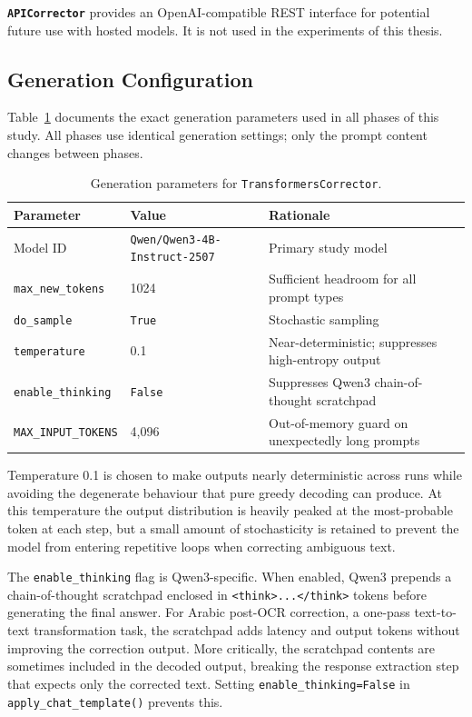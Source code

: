 \textbf{\texttt{APICorrector}} provides an OpenAI-compatible REST interface for
potential future use with hosted models.
It is not used in the experiments of this thesis.

\subsection{Generation Configuration}
\label{subsec:gen_config}

Table~\ref{tab:gen_config} documents the exact generation parameters used in all
phases of this study.
All phases use identical generation settings; only the prompt content changes
between phases.

\begin{table}[ht]
\caption{Generation parameters for \texttt{TransformersCorrector}.}
\label{tab:gen_config}
\centering
\renewcommand{\arraystretch}{1.3}
\begin{tabular}{lll}
\toprule
\textbf{Parameter} & \textbf{Value} & \textbf{Rationale} \\
\midrule
Model ID             & \texttt{Qwen/Qwen3-4B-Instruct-2507} & Primary study model \\
\texttt{max\_new\_tokens} & 1024        & Sufficient headroom for all prompt types \\
\texttt{do\_sample}       & \texttt{True}  & Stochastic sampling \\
\texttt{temperature}      & 0.1         & Near-deterministic; suppresses high-entropy output \\
\texttt{enable\_thinking} & \texttt{False} & Suppresses Qwen3 chain-of-thought scratchpad \\
\texttt{MAX\_INPUT\_TOKENS} & 4,096    & Out-of-memory guard on unexpectedly long prompts \\
\bottomrule
\end{tabular}
\end{table}

\noindent
Temperature 0.1 is chosen to make outputs nearly deterministic across runs while
avoiding the degenerate behaviour that pure greedy decoding can produce.
At this temperature the output distribution is heavily peaked at the
most-probable token at each step, but a small amount of stochasticity is retained
to prevent the model from entering repetitive loops when correcting ambiguous text.

The \texttt{enable\_thinking} flag is Qwen3-specific.
When enabled, Qwen3 prepends a chain-of-thought scratchpad enclosed in
\texttt{<think>...</think>} tokens before generating the final answer.
For Arabic post-OCR correction, a one-pass text-to-text transformation task,
the scratchpad adds latency and output tokens without improving the correction
output.
More critically, the scratchpad contents are sometimes included in the decoded
output, breaking the response extraction step that expects only the corrected
text.
Setting \texttt{enable\_thinking=False} in \texttt{apply\_chat\_template()}
prevents this.


